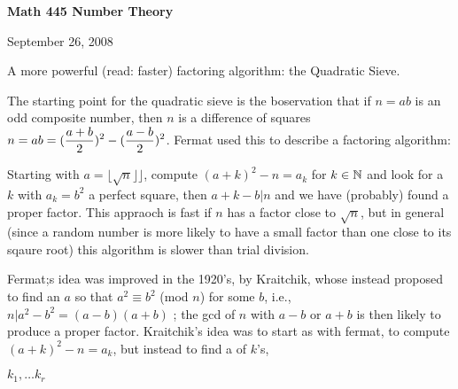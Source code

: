 





\loadmsbm

\nopagenumbers
\overfullrule=0pt


\def\ctln{\centerline}
\def\u{\underbar}
\def\ssk{\smallskip}
\def\msk{\medskip}
\def\bsk{\bigskip}
\def\dl{\displaystyle}
\def\ni{\noindent}


\ctln{\bf Math 445 Number Theory}

\medskip

\ctln{September 26, 2008}

\bigskip

A more powerful (read: faster) factoring algorithm: the Quadratic Sieve.

\ssk

The starting point for the quadratic sieve is the boservation that if $n=ab$ is an odd composite number, then 
$n$ is a difference of squares $\dl n=ab=({{a+b}\over{2}})^2-({{a-b}\over{2}})^2$. Fermat used this to describe a factoring algorithm:

\ssk

Starting with $a=\lfloor\sqrt{n}\rfloor\rfloor$, compute $(a+k)^2-n=a_k$ for $k\in{\Bbb N}$ and look for a $k$ with $a_k=b^2$ a perfect square,
then $a+k-b|n$ and we have (probably) found a proper factor. This appraoch is fast if $n$ has a factor close to $\sqrt{n}$, but in general
(since a random number is more likely to have a small factor than one close to its sqaure root) this algorithm is slower than trial division.

\msk

Fermat;s idea was improved in the 1920's, by Kraitchik, whose instead proposed to find an $a$ so that $a^2\equiv b^2$ (mod $n$) for some $b$, i.e., 
$n|a^2-b^2=(a-b)(a+b)$ ; the gcd of $n$ with $a-b$ or $a+b$ is then likely to produce a proper factor. Kraitchik's idea was to start as
with fermat, to compute $(a+k)^2-n=a_k$, but instead to find a  of $k$'s, 

\ssk

\ctln{$k_1,\ldots k_r$}

\ssk

